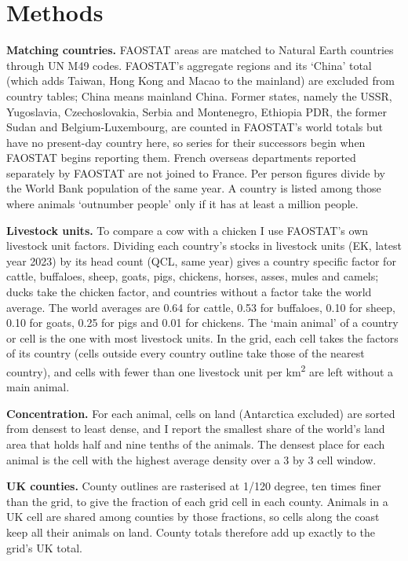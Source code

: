 \documentclass[11pt,a4paper]{article}
\begin{document}
\section{Methods}
\textbf{Matching countries.} FAOSTAT areas are matched to Natural Earth countries through UN M49 codes. FAOSTAT's aggregate regions and its `China' total (which adds Taiwan, Hong Kong and Macao to the mainland) are excluded from country tables; China means mainland China. Former states, namely the USSR, Yugoslavia, Czechoslovakia, Serbia and Montenegro, Ethiopia PDR, the former Sudan and Belgium-Luxembourg, are counted in FAOSTAT's world totals but have no present-day country here, so series for their successors begin when FAOSTAT begins reporting them. French overseas departments reported separately by FAOSTAT are not joined to France. Per person figures divide by the World Bank population of the same year. A country is listed among those where animals `outnumber people' only if it has at least a million people.

\textbf{Livestock units.} To compare a cow with a chicken I use FAOSTAT's own livestock unit factors. Dividing each country's stocks in livestock units (EK, latest year 2023) by its head count (QCL, same year) gives a country specific factor for cattle, buffaloes, sheep, goats, pigs, chickens, horses, asses, mules and camels; ducks take the chicken factor, and countries without a factor take the world average. The world averages are 0.64 for cattle, 0.53 for buffaloes, 0.10 for sheep, 0.10 for goats, 0.25 for pigs and 0.01 for chickens. The `main animal' of a country or cell is the one with most livestock units. In the grid, each cell takes the factors of its country (cells outside every country outline take those of the nearest country), and cells with fewer than one livestock unit per km\textsuperscript{2} are left without a main animal.

\textbf{Concentration.} For each animal, cells on land (Antarctica excluded) are sorted from densest to least dense, and I report the smallest share of the world's land area that holds half and nine tenths of the animals. The densest place for each animal is the cell with the highest average density over a 3 by 3 cell window.

\textbf{UK counties.} County outlines are rasterised at 1/120 degree, ten times finer than the grid, to give the fraction of each grid cell in each county. Animals in a UK cell are shared among counties by those fractions, so cells along the coast keep all their animals on land. County totals therefore add up exactly to the grid's UK total.
\end{document}
